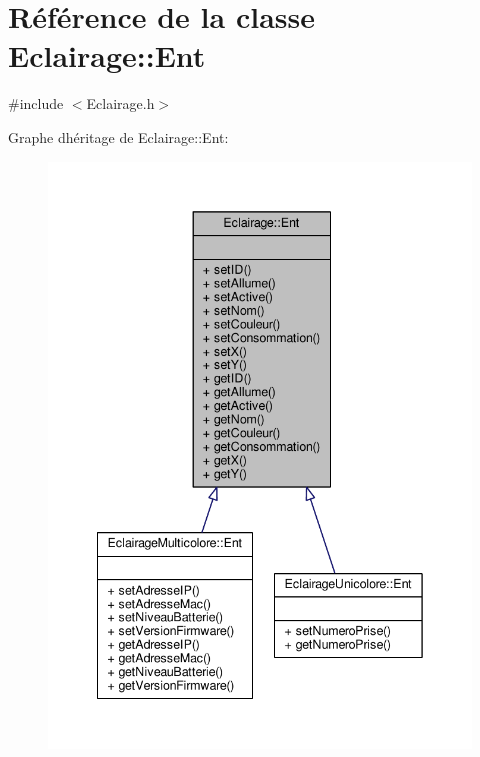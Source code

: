 \hypertarget{classEclairage_1_1Ent}{}\section{Référence de la classe Eclairage\+:\+:Ent}
\label{classEclairage_1_1Ent}


{\ttfamily \#include $<$Eclairage.\+h$>$}



Graphe d\textquotesingle{}héritage de Eclairage\+:\+:Ent\+:\nopagebreak
\begin{figure}[H]
\begin{center}
\leavevmode
\includegraphics[width=342pt]{classEclairage_1_1Ent__inherit__graph}
\end{center}
\end{figure}


